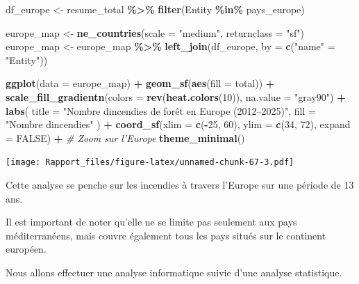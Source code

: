 \documentclass[
]{article}
\newenvironment{Shaded}{\begin{snugshade}}{\end{snugshade}}
\newcommand{\AttributeTok}[1]{\textcolor[rgb]{0.13,0.29,0.53}{#1}}
\newcommand{\CommentTok}[1]{\textcolor[rgb]{0.56,0.35,0.01}{\textit{#1}}}
\newcommand{\ConstantTok}[1]{\textcolor[rgb]{0.56,0.35,0.01}{#1}}
\newcommand{\DecValTok}[1]{\textcolor[rgb]{0.00,0.00,0.81}{#1}}
\newcommand{\FunctionTok}[1]{\textcolor[rgb]{0.13,0.29,0.53}{\textbf{#1}}}
\newcommand{\NormalTok}[1]{#1}
\newcommand{\OtherTok}[1]{\textcolor[rgb]{0.56,0.35,0.01}{#1}}
\newcommand{\SpecialCharTok}[1]{\textcolor[rgb]{0.81,0.36,0.00}{\textbf{#1}}}
\newcommand{\StringTok}[1]{\textcolor[rgb]{0.31,0.60,0.02}{#1}}
\begin{document}
\begin{Shaded}
\begin{Highlighting}[]
\NormalTok{df\_europe }\OtherTok{\textless{}{-}}\NormalTok{ resume\_total }\SpecialCharTok{\%\textgreater{}\%} \FunctionTok{filter}\NormalTok{(Entity }\SpecialCharTok{\%in\%}\NormalTok{ pays\_europe)}

\NormalTok{europe\_map }\OtherTok{\textless{}{-}} \FunctionTok{ne\_countries}\NormalTok{(}\AttributeTok{scale =} \StringTok{"medium"}\NormalTok{, }\AttributeTok{returnclass =} \StringTok{"sf"}\NormalTok{)}
\NormalTok{europe\_map }\OtherTok{\textless{}{-}}\NormalTok{ europe\_map }\SpecialCharTok{\%\textgreater{}\%}
  \FunctionTok{left\_join}\NormalTok{(df\_europe, }\AttributeTok{by =} \FunctionTok{c}\NormalTok{(}\StringTok{"name"} \OtherTok{=} \StringTok{"Entity"}\NormalTok{))}

\FunctionTok{ggplot}\NormalTok{(}\AttributeTok{data =}\NormalTok{ europe\_map) }\SpecialCharTok{+}
  \FunctionTok{geom\_sf}\NormalTok{(}\FunctionTok{aes}\NormalTok{(}\AttributeTok{fill =}\NormalTok{ total)) }\SpecialCharTok{+}
  \FunctionTok{scale\_fill\_gradientn}\NormalTok{(}\AttributeTok{colors =} \FunctionTok{rev}\NormalTok{(}\FunctionTok{heat.colors}\NormalTok{(}\DecValTok{10}\NormalTok{)), }\AttributeTok{na.value =} \StringTok{"gray90"}\NormalTok{) }\SpecialCharTok{+}
  \FunctionTok{labs}\NormalTok{(}
    \AttributeTok{title =} \StringTok{"Nombre d\textquotesingle{}incendies de forêt en Europe (2012–2025)"}\NormalTok{,}
    \AttributeTok{fill =} \StringTok{"Nombre d\textquotesingle{}incendies"}
\NormalTok{  ) }\SpecialCharTok{+}
  \FunctionTok{coord\_sf}\NormalTok{(}\AttributeTok{xlim =} \FunctionTok{c}\NormalTok{(}\SpecialCharTok{{-}}\DecValTok{25}\NormalTok{, }\DecValTok{60}\NormalTok{), }\AttributeTok{ylim =} \FunctionTok{c}\NormalTok{(}\DecValTok{34}\NormalTok{, }\DecValTok{72}\NormalTok{), }\AttributeTok{expand =} \ConstantTok{FALSE}\NormalTok{) }\SpecialCharTok{+}  \CommentTok{\# Zoom sur l’Europe}
  \FunctionTok{theme\_minimal}\NormalTok{()}
\end{Highlighting}
\end{Shaded}

\texttt{[image: Rapport\_files/figure-latex/unnamed-chunk-67-3.pdf]}

Cette analyse se penche sur les incendies à travers l'Europe sur une
période de 13 ans.

Il est important de noter qu'elle ne se limite pas seulement aux pays
méditerranéens, mais couvre également tous les pays situés sur le
continent européen.

Nous allons effectuer une analyse informatique suivie d'une analyse
statistique.
\end{document}
